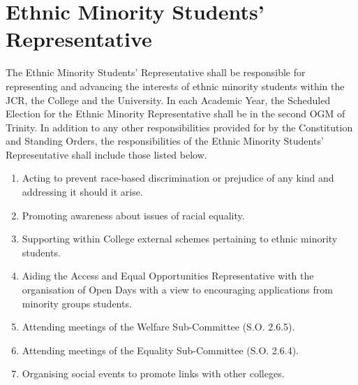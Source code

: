 \section{Ethnic Minority Students' Representative}
\npara The Ethnic Minority Students' Representative shall be responsible for representing and advancing the interests of ethnic minority students within the JCR, the College and the University. 
\npara In each Academic Year, the Scheduled Election for the Ethnic Minority Representative shall be in the second OGM of Trinity.
\npara In addition to any other responsibilities provided for by the Constitution and Standing Orders, the responsibilities of the Ethnic Minority Students' Representative shall include those listed below.
\begin{enumerate}
	\item Acting to prevent race-based discrimination or prejudice of any kind and addressing it should it arise.
	\item Promoting awareness about issues of racial equality.
	\item Supporting within College external schemes pertaining to ethnic minority students.
	\item Aiding the Access and Equal Opportunities Representative with the organisation of Open Days with a view to encouraging applications from minority groups students.
	\item Attending meetings of the Welfare Sub-Committee (S.O. 2.6.5).
	\item Attending meetings of the Equality Sub-Committee (S.O. 2.6.4).
	\item Organising social events to promote links with other colleges.
\end{enumerate}
